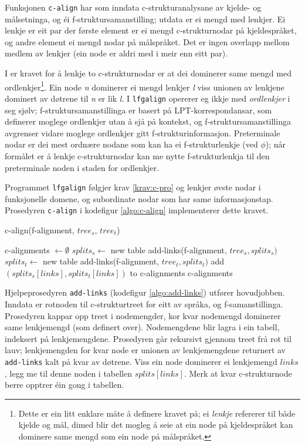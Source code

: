 \documentclass[11pt,a4paper,oneside,draft]{book}
\begin{document}
Funksjonen \texttt{c-align} har som inndata c-strukturanalysane av kjelde- og
målsetninga, og éi f-struktursamanstilling; utdata er ei mengd med
lenkjer. Ei lenkje er eit par der første element er ei mengd
c-strukturnodar på kjeldespråket, og andre element ei mengd nodar på
målspråket. Det er ingen overlapp mellom medlem av lenkjer (ein node
er aldri med i meir enn eitt par).

I \citet[s.~77]{dyvik2009lmp} er kravet for å lenkje to
c-strukturnodar er at dei dominerer same mengd med
ordlenkjer\footnote{Dette er ein litt enklare måte å definere kravet på; ei
        \emph{lenkje} refererer til både kjelde og mål, dimed blir det
        mogleg å seie at ein node på kjeldespråket kan dominere same
        mengd som ein node på målspråket. }. Ein node \emph{n} dominerer ei mengd lenkjer \emph{l} viss
unionen av lenkjene dominert av døtrene til \emph{n} er lik \emph{l}. I
\texttt{lfgalign} opererer eg ikkje med \emph{ordlenkjer} i seg sjølv;
f-struktursamanstillinga er basert på LPT-korrespondansar, som
definerer moglege ordlenkjer utan å sjå på kontekst, og
f-struktursamanstillinga avgrenser vidare moglege ordlenkjer gitt
f-strukturinformasjon. Preterminale nodar er dei mest ordnære nodane
som kan ha ei f-strukturlenkje (ved $\phi$); når formålet er å lenkje
c-strukturnodar kan me nytte f-strukturlenkja til den preterminale
noden i staden for ordlenkjer.

Programmet \texttt{lfgalign} følgjer krav \ref{krav:c-pro} og
lenkjer øvste nodar i funksjonelle domene, og subordinate nodar som
har same informasjonstap. Prosedyren \texttt{c-align} i kodefigur
\ref{algo:c-align} implementerer dette kravet. 

 \begin{algorithm}[]
   \caption{c-align(f-alignment, $tree_s$, $tree_t$)}
   \label{algo:c-align}
    
   c-alignments $\gets \emptyset$ \;
   $splits_s \gets$ new table \;
   add-links(f-alignment, $tree_s, splits_s)$  \;
   $splits_t \gets$ new table \;
   add-links(f-alignment, $tree_t, splits_t)$  \;
    {
        {
             add $(splits_s[links],splits_t[links])$ to c-alignments \;
        }
    }
    \Return c-alignments \;
    \end{algorithm}    

Hjelpeprosedyren \texttt{add-links} (kodefigur \ref{algo:add-links}) utfører
hovudjobben. Inndata er rotnoden til c-strukturtreet for eitt av
språka, og f-samanstillinga. Prosedyren kappar opp treet i
nodemengder, kor kvar nodemengd dominerer same lenkjemengd (som
definert over).  Nodemengdene blir lagra i ein tabell, indeksert på
lenkjemengdene. Prosedyren går rekursivt gjennom treet frå rot til
lauv; lenkjemengden for kvar node er unionen av lenkjemengdene
returnert av \texttt{add-links} kalt på kvar av døtrene. Viss ein node
dominerer ei lenkjemengd $links$, legg me til denne noden i tabellen
$splits[links]$. Merk at kvar c-strukturnode berre opptrer éin gong i
tabellen.
\end{document}
